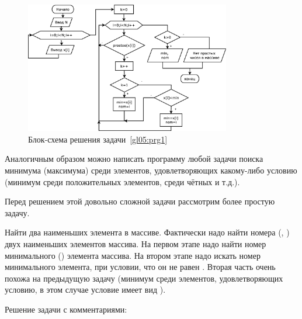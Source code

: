 \begin{figure}[htb]
\begin{center}
\includegraphics[width=0.8\textwidth]{img/ris_5_8}
\caption{Блок-схема решения задачи~\ref{gl05:prg1}}
\label{ch05:refDrawing7}
\end{center}
\end{figure}



Аналогичным образом можно написать программу любой задачи поиска минимума (максимума) среди элементов, удовлетворяющих
какому-либо условию (минимум среди положительных элементов, среди чётных и т.д.). 


Перед решением этой довольно сложной задачи рассмотрим более простую задачу.

Найти два наименьших элемента в массиве. Фактически надо найти номера
(, ) двух наименьших элементов
массива. На первом этапе надо найти номер минимального () элемента массива. На втором этапе
надо искать номер минимального элемента, при условии, что он не равен . Вторая часть очень
похожа на предыдущую задачу (минимум среди элементов, удовлетворяющих условию, в этом случае условие имеет вид
).

Решение задачи с комментариями:


